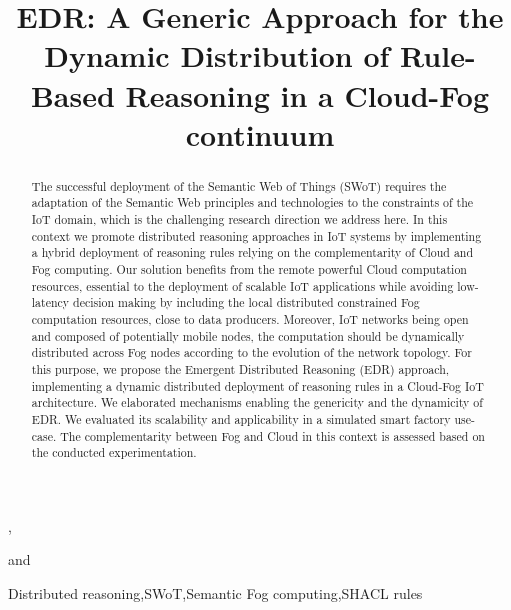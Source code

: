 \documentclass{iosart2c}
\begin{document}
\begin{frontmatter}                           %
	
\title{EDR: A Generic Approach for the Dynamic Distribution of Rule-Based Reasoning in a Cloud-Fog continuum}



\author[A,B]{ },
\author[B]{ }
\author[A]{ }
and
\author[B]{ }
\address[A]{IRIT,\\Maison de la Recherche, Univ. Toulouse Jean Jaurès,\\5 allées Antonio Machado, F-31000 Toulouse\\email: \{name.surname\}@irit.fr}
\address[B]{LAAS-CNRS,\\ Université de Toulouse, CNRS, INSA, Toulouse, France\\email: \{name.surname\}@laas.fr}



\begin{abstract}
The successful deployment of the Semantic Web of Things (SWoT) requires the adaptation of the Semantic Web principles and technologies to the constraints of the IoT domain, which is the challenging research direction we address here. 
In this context we promote distributed reasoning approaches in IoT systems by implementing a hybrid deployment of reasoning rules relying on the complementarity of Cloud and Fog computing.  
Our solution benefits from the remote powerful Cloud computation resources, essential to the deployment of scalable IoT applications while avoiding low-latency decision making by including the local distributed constrained Fog computation resources, close to data producers.
Moreover, IoT networks being open and composed of potentially mobile nodes, the computation should be dynamically distributed across Fog nodes according to the evolution of the network topology.
For this purpose, we propose the Emergent Distributed Reasoning (EDR) approach, implementing a dynamic distributed deployment of reasoning rules in a Cloud-Fog IoT architecture.
We elaborated mechanisms enabling the genericity and the dynamicity of EDR.
We evaluated its scalability and applicability in a simulated smart factory use-case.
The complementarity between Fog and Cloud in this context is assessed based on the conducted experimentation.
\end{abstract}

\begin{keyword}
	Distributed reasoning\sep SWoT\sep Semantic Fog computing\sep SHACL rules
\end{keyword}
	
\end{frontmatter}
\end{document}
